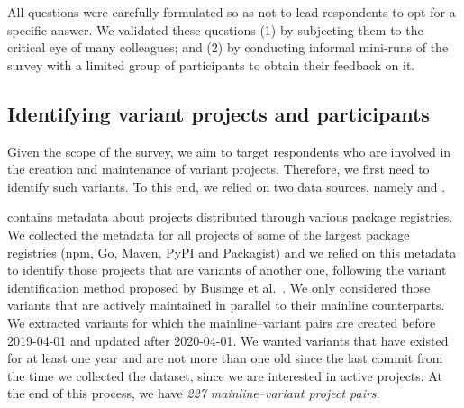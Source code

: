 All questions were carefully formulated so as not to lead respondents to opt for a specific answer. We validated these questions (1) by subjecting them to the critical eye of many colleagues; and (2) by conducting informal mini-runs of the survey with a limited group of participants to obtain their feedback on it.



\subsection{Identifying variant projects and participants}
\label{sec:forks_and_participants}

Given the scope of the survey, we aim to target respondents who are involved in the creation and maintenance of variant projects.%
Therefore, we first need to identify such variants.
To this end, we relied on two data sources, namely \librariesio and \gh.

\librariesio contains metadata about projects distributed through various package registries. We collected the metadata for all projects of some of the largest package registries (\textsf{npm, Go, Maven, PyPI} and \textsf{Packagist}) and we relied on this metadata to identify those projects that are variants of another one, following the variant identification method proposed by  Businge et al.~\cite{businge:emse:2021,businge:benevol:2020}. %
We only considered those variants that are actively maintained in parallel to their mainline counterparts. We extracted variants for which the mainline--variant pairs are created before 2019-04-01 and updated after 2020-04-01. We wanted variants that have existed for at least one year and are not more than one old since the last commit from the time we collected the dataset, since we are interested in active projects.
At the end of this process, we have \textit{227 mainline–variant project pairs}.

